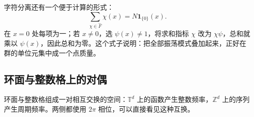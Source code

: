 字符分离还有一个便于计算的形式：
\begin{equation}\label{b2:eq:I4-dual-orthogonality}
 \sum_{\chi\in\widehat F}\chi(x)
 =N\mathbf1_{\{0\}}(x).
\end{equation}
在 \(x=0\) 处每项为一；若 \(x\ne0\)，选 \(\psi(x)\ne1\)，将求和指标 \(\chi\) 改为 \(\chi\psi\)，总和就乘以 \(\psi(x)\)，因此总和为零。这个式子说明：把全部振荡模式叠加起来，正好在群的单位元集中成一个点质量。

\subsection{环面与整数格上的对偶}
\label{b2:subsec:I20402}

环面与整数格组成一对相互交换的空间：\(\mathbb T^d\) 上的函数产生整数频率，\(\mathbb Z^d\) 上的序列产生周期频率。两侧都使用 \(2\pi\) 相位，可以直接看见这种互换。


